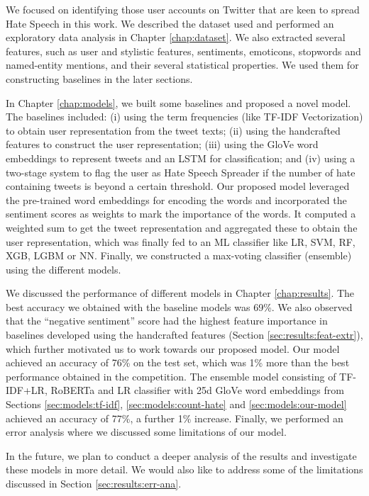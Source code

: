 We focused on identifying those user accounts on Twitter that are keen to spread Hate Speech in this work.
We described the dataset used and performed an exploratory data analysis in Chapter \ref{chap:dataset}. We also extracted several features, such as user and stylistic features, sentiments, emoticons, stopwords and named-entity mentions, and their several statistical properties. We used them for constructing baselines in the later sections.  

In Chapter \ref{chap:models}, we built some baselines and proposed a novel model. The baselines included: (i) using the term frequencies (like \ac{TF-IDF} Vectorization) to obtain user representation from the tweet texts; (ii) using the handcrafted features to construct the user representation; (iii) using the \ac{GloVe} word embeddings to represent tweets and an \ac{LSTM} for classification; and (iv) using a two-stage system to flag the user as Hate Speech Spreader if the number of hate containing tweets is beyond a certain threshold.
Our proposed model leveraged the pre-trained word embeddings for encoding the words and incorporated the sentiment scores as weights to mark the importance of the words. It computed a weighted sum to get the tweet representation and aggregated these to obtain the user representation, which was finally fed to an ML classifier like \ac{LR}, \ac{SVM}, \ac{RF}, \ac{XGB}, \ac{LGBM} or \ac{NN}. Finally, we constructed a max-voting classifier (ensemble) using the different models.

We discussed the performance of different models in Chapter \ref{chap:results}. The best accuracy we obtained with the baseline models was 69\%. We also observed that the ``negative sentiment'' score had the highest feature importance in baselines developed using the handcrafted features (Section \ref{sec:results:feat-extr}), which further motivated us to work towards our proposed model. Our model achieved an accuracy of 76\% on the test set, which was 1\% more than the best performance obtained in the competition. The ensemble model consisting of \ac{TF-IDF}+\ac{LR}, \ac{RoBERTa} and \ac{LR} classifier with 25d \ac{GloVe} word embeddings from Sections \ref{sec:models:tf-idf}, \ref{sec:models:count-hate} and \ref{sec:models:our-model} achieved an accuracy of 77\%, a further 1\% increase. Finally, we performed an error analysis where we discussed some limitations of our model.

In the future, we plan to conduct a deeper analysis of the results and investigate these models in more detail. We would also like to address some of the limitations discussed in Section \ref{sec:results:err-ana}.



